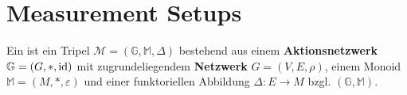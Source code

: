 
\chapter{Measurement Setups}

\begin{definition}
	Ein  ist ein Tripel $\mathcal{M}=(\mathbb{G},\mathbb{M},\Delta)$ bestehend aus einem 
	\textbf{Aktionsnetzwerk} $\mathbb{G}=(G,\ast,\operatorname{id})$ mit zugrundeliegendem \textbf{Netzwerk} $G=(V,E,\rho)$, 
	einem Monoid $\mathbb{M}=(M,\ast,\varepsilon)$ und einer funktoriellen Abbildung $\Delta:E\to M$ bzgl. $(\mathbb{G},\mathbb{M})$.
\end{definition}


